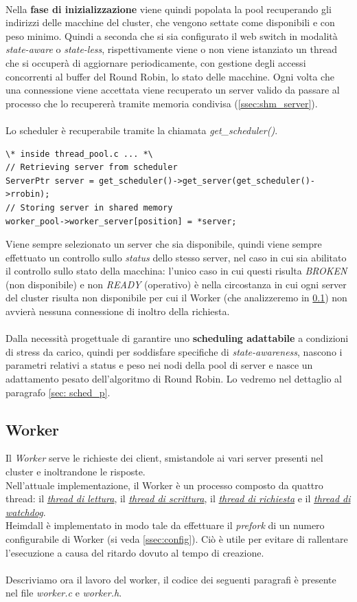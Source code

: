 \documentclass[italian]{tktltiki2}
\begin{document}
\\
Nella \textbf{fase di inizializzazione} viene quindi popolata la pool recuperando gli indirizzi delle macchine del cluster, che vengono settate come disponibili e con peso minimo. Quindi a seconda che si sia configurato il web switch in modalità \emph{state-aware} o \emph{state-less}, rispettivamente viene o non viene istanziato un thread che si occuperà di aggiornare periodicamente, con gestione degli accessi concorrenti al buffer del Round Robin, lo stato delle macchine. Ogni volta che una connessione viene accettata viene recuperato un server valido da passare al processo che lo recupererà tramite memoria condivisa (\ref{ssec:shm_server}).
\\
\\ Lo scheduler è recuperabile tramite la chiamata \emph{get\_scheduler()}.
\begin{lstlisting}
\* inside thread_pool.c ... *\
// Retrieving server from scheduler
ServerPtr server = get_scheduler()->get_server(get_scheduler()->rrobin);
// Storing server in shared memory
worker_pool->worker_server[position] = *server;
\end{lstlisting}
Viene sempre selezionato un server che sia disponibile, quindi viene sempre effettuato un controllo sullo \emph{status} dello stesso server, nel caso in cui sia abilitato il controllo sullo stato della macchina: l'unico caso in cui questi risulta \emph{BROKEN} (non disponibile) e non \emph{READY} (operativo) è nella circostanza in cui ogni server del cluster risulta non disponibile per cui il Worker (che analizzeremo in \ref{sec:worker}) non avvierà nessuna connessione di inoltro della richiesta. 
\\
\\
Dalla necessità progettuale di garantire uno \textbf{scheduling adattabile} a condizioni di stress da carico, quindi per soddisfare specifiche di \emph{state-awareness}, nascono i parametri relativi a status e peso nei nodi della pool di server e nasce un adattamento pesato dell'algoritmo di Round Robin. Lo vedremo nel dettaglio al paragrafo \ref{sec: sched_p}.
\subsection{Worker}
\label{sec:worker}
Il \emph{Worker} serve le richieste dei client, smistandole ai vari server presenti nel cluster e inoltrandone le risposte.
\\
Nell'attuale implementazione, il Worker è un processo composto da quattro thread: il \hyperref[sec:reader]{\emph{thread di lettura}}, il \hyperref[sec:writer]{\emph{thread di scrittura}}, il \hyperref[sec:request]{\emph{thread di richiesta}} e il \hyperref[sec:watchdog]{\emph{thread di watchdog}}.
\\
Heimdall è implementato in modo tale da effettuare il \emph{prefork} di un numero configurabile di Worker (si veda \ref{ssec:config}). Ciò è utile per evitare di rallentare l'esecuzione a causa del ritardo dovuto al tempo di creazione.
\\\\
Descriviamo ora il lavoro del worker, il codice dei seguenti paragrafi è presente nel file \emph{worker.c} e \emph{worker.h}.
\end{document}
